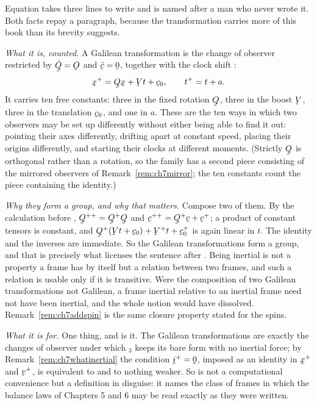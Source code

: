 \begin{remark}\label{rem:ch7galileo}
Equation  takes three lines to write and is named after a man
who never wrote it. Both facts repay a paragraph, because the
transformation carries more of this book than its brevity suggests.

\emph{What it is, counted.} A Galilean transformation is the change of
observer  restricted by $\dot\bQ=\Ob$ and $\ddot\bc=\bze$,
together with the clock shift :
\[
   \bx^{+}=\bQ\bx+\bV t+\bc_{0},
   \qquad
   t^{+}=t+a .
\]
It carries ten free constants: three in the fixed rotation $\bQ$, three
in the boost $\bV$, three in the translation $\bc_{0}$, and one in $a$.
These are the ten ways in which two observers may be set up differently
without either being able to find it out: pointing their axes
differently, drifting apart at constant speed, placing their origins
differently, and starting their clocks at different moments. (Strictly
$\bQ$ is orthogonal rather than a rotation, so the family has a second
piece consisting of the mirrored observers of
Remark~\ref{rem:ch7mirror}; the ten constants count the piece containing
the identity.)

\emph{Why they form a group, and why that matters.} Compose two of them.
By the calculation before , $\bQ^{++}=\bQ^{+}\bQ$ and
$\bc^{++}=\bQ^{+}\bc+\bc^{+}$; a product of constant tensors is constant,
and $\bQ^{+}(\bV t+\bc_{0})+\bV^{+}t+\bc^{+}_{0}$ is again linear in $t$.
The identity and the inverses are immediate. So the Galilean
transformations form a group, and that is precisely what licenses the
sentence after . Being inertial is not a property a frame has
by itself but a relation between two frames, and such a relation is
usable only if it is transitive. Were the composition of two Galilean
transformations not Galilean, a frame inertial relative to an inertial
frame need not have been inertial, and the whole notion would have
dissolved. Remark~\ref{rem:ch7addspin} is the same closure property
stated for the spins.

\emph{What it is for.} One thing, and  is it. The Galilean
transformations are exactly the changes of observer under which
$_{3}$ keeps its bare form with no inertial force; by
Remark~\ref{rem:ch7whatinertial} the condition $\vek{i}^{+}=\bze$,
imposed as an identity in $\bx^{+}$ and $\bv^{+}$, is equivalent to
 and to nothing weaker. So  is not a computational
convenience but a definition in disguise: it names the class of frames in
which the balance laws of Chapters 5 and 6 may be read exactly as they
were written.


\end{remark}
